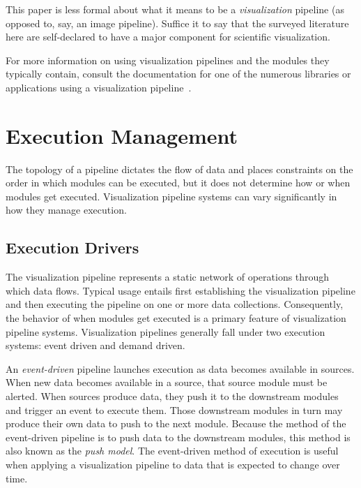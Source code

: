 \documentclass[journal,twocolumn,10pt,letterpaper,twoside]{IEEEtran}
\newcommand*{\lcite}[1]{~\cite{#1}}
\newcommand*{\keyterm}[1]{\emph{#1}}
\begin{document}
This paper is less formal about what it means to be a \emph{visualization}
pipeline (as opposed to, say, an image pipeline). Suffice it to say that
the surveyed literature here are self-declared to have a major component
for scientific visualization.

For more information on using visualization pipelines and the modules
they typically contain, consult the documentation for one of the numerous
libraries or applications using a visualization
pipeline\lcite{VTK,ParaView,ParaViewTutorial,SCIRunUserGuide,IRISExplorerUsersGuide,VisTrailsDocumentation,OpenDXGuide}.


\section{Execution Management}
\label{sec:ExecutionManagement}

The topology of a pipeline dictates the flow of data and places constraints
on the order in which modules can be executed, but it does not determine
how or when modules get executed.  Visualization pipeline systems can
vary significantly in how they manage execution.

\subsection{Execution Drivers}
\label{sec:ExecutionDrivers}

The visualization pipeline represents a static network of operations
through which data flows.  Typical usage entails first establishing the
visualization pipeline and then executing the pipeline on one or more data
collections.  Consequently, the behavior of when modules get executed is
a primary feature of visualization pipeline systems.  Visualization
pipelines generally fall under two execution systems: event driven and
demand driven.

An \keyterm{event-driven} pipeline launches execution as data becomes
available in sources.  When new data becomes available in a source, that
source module must be alerted.  When sources produce data, they push it
to the downstream modules and trigger an event to execute them.  Those
downstream modules in turn may produce their own data to push to the
next module.  Because the method of the event-driven pipeline is to push
data to the downstream modules, this method is also known as the
\keyterm{push model}.  The event-driven method of execution is useful when
applying a visualization pipeline to data that is expected to change over
time.
\end{document}
